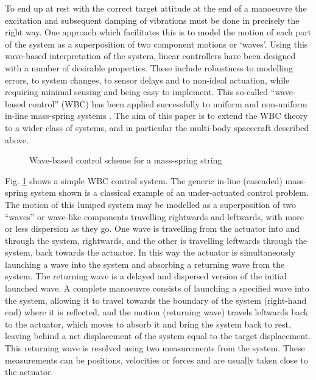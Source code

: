 \documentclass{mbd_fullpaper}
\begin{document}
To end up at rest with the correct target attitude at the end of a manoeuvre the excitation and subsequent damping of vibrations must be done in precisely the right way.
One approach which facilitates this is to model the motion of each part of the system as a superposition of two component motions or ‘waves’.
Using this wave-based interpretation of the system, linear controllers have been designed with a number of desirable properties.
These include robustness to modelling errors, to system changes, to sensor delays and to non-ideal actuation, while requiring minimal sensing and being easy to implement.
This so-called “wave-based control” (WBC) has been applied successfully to uniform and non-uniform in-line mass-spring systems \cite{OConnor1998,OConnor2003,Connor2005,OConnor2011,OConnor2009}.
The aim of this paper is to extend the WBC theory to a wider class of systems, and in particular the multi-body spacecraft described above.

\begin{figure}[h]
  \begin{center}
    	
	\caption{Wave-based control scheme for a mass-spring string \label{fig:wave-based-control}}
  \end{center}
\end{figure}
Fig. \ref{fig:wave-based-control} shows a simple WBC control system.
The generic in-line (cascaded) mass-spring system shown is a classical example of an under-actuated control problem.
The motion of this lumped system may be modelled as a superposition of two “waves” or wave-like components travelling rightwards and leftwards, with more or less dispersion as they go.
One wave is travelling from the actuator into and through the system, rightwards, and the other is travelling leftwards through the system, back towards the actuator.
In this way the actuator is simultaneously launching a wave into the system and absorbing a returning wave from the system.
The returning wave is a delayed and dispersed version of the initial launched wave.
A complete manoeuvre consists of launching a specified wave into the system, allowing it to travel towards the boundary of the system (right-hand end) where it is reflected, and the motion (returning wave) travels leftwards back to the actuator, which moves to absorb it and bring the system back to rest, leaving behind a net displacement of the system equal to the target displacement.
This returning wave is resolved using two measurements from the system.
These measurements can be positions, velocities or forces and are usually taken close to the actuator. 
\end{document}
